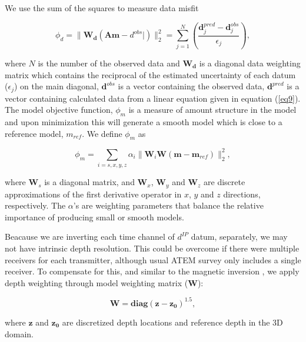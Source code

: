 \documentclass[extra,mreferee]{gji}
\newcommand{\dip}{d^{IP}}
\begin{document}
We use the sum of the squares to measure data misfit
\begin{linenomath*}
\begin{equation}
  \phi_d = \| \mathbf{W_d}(\mathbf{A}\mathbf{m}-d^{obs}|)\|^2_2 =
  \sum^N_{j=1}(\frac{\mathbf{d}^{pred}_j-\mathbf{d}^{obs}_j}{\epsilon_j}),
  \label{eq11}
\end{equation}
\end{linenomath*}
where $N$ is the number of the observed data and $\mathbf{W_d}$ is a diagonal data weighting matrix which contains the reciprocal of the estimated uncertainty of each datum ($\epsilon_j$) on the main diagonal,  $\mathbf{d}^{obs}$ is a vector containing the observed data, $\mathbf{d}^{pred}$ is a vector containing calculated data from a linear equation given in equation (\ref{eq9}).
The model objective function, $\phi_m$ is a measure of amount structure in the model and upon minimization this will generate a smooth model which is close to a reference model, $m_{ref}$. 
We define $\phi_m$ as
\begin{linenomath*}
\begin{equation}
  \phi_m = \sum_{i=s,x,y,z} \alpha_i\| \mathbf{W}_i\mathbf{W}(\mathbf{m}-\mathbf{m}_{ref})\|^2_2,
  \label{eq12}
\end{equation}
\end{linenomath*}
where $\mathbf{W}_s$ is a diagonal matrix, and $\mathbf{W}_x$, $\mathbf{W}_y$ and $\mathbf{W}_z$ are discrete approximations of the first derivative operator in $x$, $y$ and $z$ directions, respectively.  
The $\alpha$'s are weighting parameters that balance the relative importance of producing small or smooth models.

Beacause we are inverting each time channel of $\dip$ datum, separately, we may not have intrinsic depth resolution. This could be overcome if there were multiple receivers for each transmitter, although usual ATEM survey only includes a single receiver. To compensate for this, and similar to the magnetic inversion \cite[]{LiMag3D}, we apply depth weighting through model weighting matrix ($\mathbf{W}$):
\begin{linenomath*}
\begin{equation}
    \mathbf{W} = \mathbf{diag}(\mathbf{z-z_0})^{1.5},
    \label{eq: weight_mat}
\end{equation}
\end{linenomath*}
where $\mathbf{z}$ and $\mathbf{z_0}$ are discretized depth locations and reference depth in the 3D domain.
\end{document}
